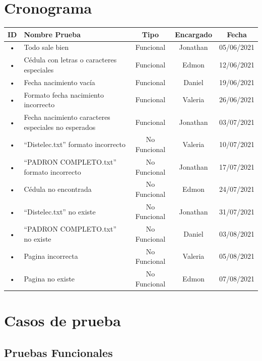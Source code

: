 \documentclass[conference]{IEEEtran}
\begin{document}
\section{Cronograma}

\begin{adjustbox}{width=0.5\textwidth}
\begin{tabular}{|c|l|c|c|c|}
\hline 
ID & Nombre Prueba & Tipo & Encargado & Fecha\\ 
\hline 
• & Todo sale bien & Funcional & Jonathan & 05/06/2021 \\ 
\hline 
• & Cédula con letras o caracteres especiales & Funcional & Edmon  &  12/06/2021\\ 
\hline 
• & Fecha nacimiento vacía & Funcional & Daniel &  19/06/2021\\ 
\hline 
• & Formato fecha nacimiento incorrecto & Funcional & Valeria  &  26/06/2021 \\ 
\hline 
• & Fecha nacimiento caracteres especiales no esperados & Funcional & Jonathan  & 03/07/2021 \\ 
\hline 
• & “Distelec.txt” formato incorrecto & No Funcional & Valeria  &  10/07/2021 \\ 
\hline 
• & “PADRON COMPLETO.txt” formato incorrecto & No Funcional & Jonathan  & 17/07/2021 \\ 
\hline 
• & Cédula no encontrada & No Funcional & Edmon  & 24/07/2021 \\ 
\hline 
• & “Distelec.txt” no existe & No Funcional & Jonathan  & 31/07/2021 \\ 
\hline 
• & “PADRON COMPLETO.txt” no existe & No Funcional & Daniel  &  03/08/2021 \\ 
\hline 
• & Pagina incorrecta & No Funcional & Valeria  & 05/08/2021 \\ 
\hline 
• & Pagina no existe & No Funcional & Edmon  & 07/08/2021 \\ 
\hline 
\end{tabular} 
\end{adjustbox}

\section{Casos de prueba}
\subsection{Pruebas Funcionales}
\end{document}
